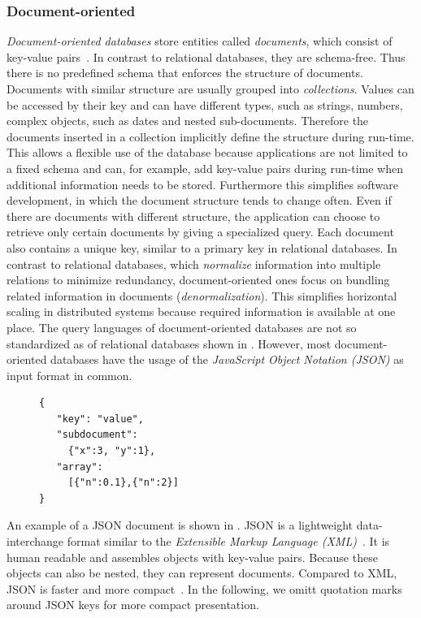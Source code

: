 \subsubsection{Document-oriented}
\label{sec:documene-design}
\emph{Document-oriented databases} store entities called \emph{documents},
which consist of key-value
pairs~\cite{mongodb,document-comparison,document-description}. In
contrast to relational databases, they are schema-free. Thus there is
no predefined schema that enforces the structure of
documents. Documents with similar structure are usually
grouped into \emph{collections}. Values can be accessed
by their key and can have different types, such as strings, numbers,
complex objects, such as dates and nested sub-documents. Therefore the documents
inserted in a collection implicitly define the structure during
run-time. This allows a flexible use of the database because
applications are not limited to a fixed schema and can, for example,
add key-value pairs during run-time when additional information needs
to be stored. Furthermore this simplifies software development, in which the
document structure tends to change often. Even if there are documents
with different structure, the application can choose to retrieve only
certain documents by giving a specialized query. Each document also
contains a unique key, similar to a primary key in relational
databases.
In contrast to relational databases, which \emph{normalize}
information into multiple relations to minimize redundancy, document-oriented ones focus on
bundling related information in documents (\emph{denormalization}).
This simplifies horizontal scaling in distributed systems because required
information is available at one place.
The query languages of document-oriented databases are not
so standardized as of relational databases shown in
. However, most document-oriented databases
have the usage of the \emph{JavaScript Object Notation (JSON)} as input format
in common.
\begin{figure}
  \vspace{-0.4cm}
\begin{lstlisting}[style=SmallJSON,
  caption={JSON document},
  label=lst:json,
  framexleftmargin=1pt, xleftmargin=0pt,
 morekeywords={}, numbers=none]
 {
   "key": "value",
   "subdocument":
     {"x":3, "y":1},
   "array":
     [{"n":0.1},{"n":2}]
}
\end{lstlisting}
\vspace{-8mm}
\end{figure}
An example of a JSON document is shown in .
JSON is a lightweight data-interchange format similar to
the \emph{Extensible Markup Language (XML)}~\cite{json}. It is human
readable and assembles objects with key-value pairs. Because these
objects can also be nested, they can represent documents. Compared to
XML, JSON is faster and more compact~\cite{json-comparison}. In the
following, we omitt quotation marks around JSON keys for more compact
presentation.


